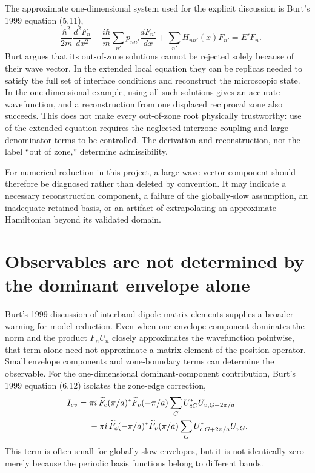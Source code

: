 The approximate one-dimensional system used for the explicit discussion is
Burt's 1999 equation (5.11),
\begin{equation}
  -\frac{\hbar^2}{2m}\frac{d^2F_n}{dx^2}
  -\frac{i\hbar}{m}\sum_{n'}p_{nn'}\frac{dF_{n'}}{dx}
  +\sum_{n'}H_{nn'}(x)F_{n'}
  =E'F_n.
  \label{eq:burt-out-of-zone-system}
\end{equation}
Burt argues that its out-of-zone solutions cannot be rejected solely because
of their wave vector. In the extended local equation they can be replicas needed
to satisfy the full set of interface conditions and reconstruct the microscopic
state. In the one-dimensional example, using all such solutions gives an
accurate wavefunction, and a reconstruction from one displaced reciprocal zone
also succeeds. This does not make every out-of-zone root physically trustworthy:
use of the extended equation requires the neglected interzone coupling and
large-denominator terms to be controlled. The derivation and reconstruction,
not the label ``out of zone,'' determine admissibility.

For numerical reduction in this project, a large-wave-vector component should
therefore be diagnosed rather than deleted by convention. It may indicate a
necessary reconstruction component, a failure of the globally-slow assumption,
an inadequate retained basis, or an artifact of extrapolating an approximate
Hamiltonian beyond its validated domain.

\section{Observables are not determined by the dominant envelope alone}

Burt's 1999 discussion of interband dipole matrix elements supplies a broader
warning for model reduction. Even when one envelope component dominates the
norm and the product $F_nU_n$ closely approximates the wavefunction pointwise,
that term alone need not approximate a matrix element of the position operator.
Small envelope components and zone-boundary terms can determine the observable.
For the one-dimensional dominant-component contribution, Burt's 1999 equation
(6.12) isolates the zone-edge correction,
\begin{align}
  I_{cv}
  ={}&\pi i\,
  \widetilde F_c(\pi/a)^{*}\widetilde F_v(-\pi/a)
  \sum_G U_{cG}^{*}U_{v,G+2\pi/a}
  \notag\\
  &-\pi i\,
  \widetilde F_c(-\pi/a)^{*}\widetilde F_v(\pi/a)
  \sum_G U_{c,G+2\pi/a}^{*}U_{vG}.
  \label{eq:burt-dipole-zone-edge}
\end{align}
This term is often small for globally slow envelopes, but it is not identically
zero merely because the periodic basis functions belong to different bands.

